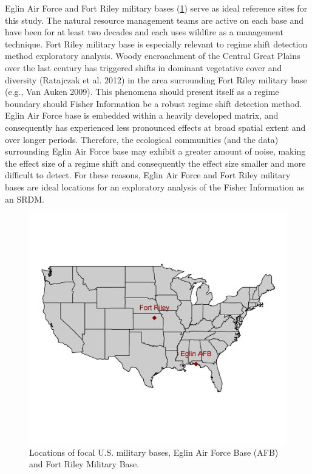 \documentclass[12pt,twoside,openany]{reedthesis}
\begin{document}
Eglin Air Force and Fort Riley military bases
(\ref{fig:basesOfInterestMap}) serve as ideal reference sites for this
study. The natural resource management teams are active on each base and
have been for at least two decades and each uses wildfire as a
management technique. Fort Riley military base is especially relevant to
regime shift detection method exploratory analysis. Woody encroachment
of the Central Great Plains over the last century has triggered shifts
in dominant vegetative cover and diversity (Ratajczak et al. 2012) in
the area surrounding Fort Riley military base (e.g., Van Auken 2009).
This phenomena should present itself as a regime boundary should Fisher
Information be a robust regime shift detection method. Eglin Air Force
base is embedded within a heavily developed matrix, and consequently has
experienced less pronounced effects at broad spatial extent and over
longer periods. Therefore, the ecological communities (and the data)
surrounding Eglin Air Force base may exhibit a greater amount of noise,
making the effect size of a regime shift and consequently the effect
size smaller and more difficult to detect. For these reasons, Eglin Air
Force and Fort Riley military bases are ideal locations for an
exploratory analysis of the Fisher Information as an SRDM.
\begin{figure}

{\centering \includegraphics[width=30.03in]{./chapterFiles/fisherSpatial/figures/figsCalledInDiss/basesOfInterestMap} 

}

\caption{Locations of focal U.S. military bases, Eglin Air Force Base (AFB) and Fort Riley Military Base.}\label{fig:basesOfInterestMap}
\end{figure}
\end{document}
